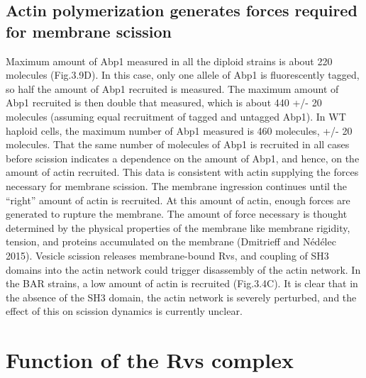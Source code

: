 \subsection{ Actin polymerization generates forces required for membrane scission}
Maximum amount of Abp1 measured in all the diploid strains is about 220 molecules (Fig.3.9D). In this case, only one allele of Abp1 is fluorescently tagged, so half the amount of Abp1 recruited is measured. The maximum amount of Abp1 recruited is then double that measured, which is about 440 +/- 20 molecules (assuming equal recruitment of tagged and untagged Abp1). In WT haploid cells, the maximum number of Abp1 measured is 460 molecules, +/- 20 molecules. That the same number of molecules of Abp1 is recruited in all cases before scission indicates a dependence on the amount of Abp1, and hence, on the amount of actin recruited. This data is consistent with actin supplying the forces necessary for membrane scission. The membrane ingression continues until the “right” amount of actin is recruited. At this amount of actin, enough forces are generated to rupture the membrane. The amount of force necessary is thought determined by the physical properties of the membrane like membrane rigidity, tension, and proteins accumulated on the membrane (Dmitrieff and Nédélec 2015). Vesicle scission releases membrane-bound Rvs, and coupling of SH3 domains into the actin network could trigger disassembly of the actin network. In the BAR strains, a low amount of actin is recruited (Fig.3.4C). It is clear that in the absence of the SH3 domain, the actin network is severely perturbed, and the effect of this on scission dynamics is currently unclear. 



\section{Function of the Rvs complex}

